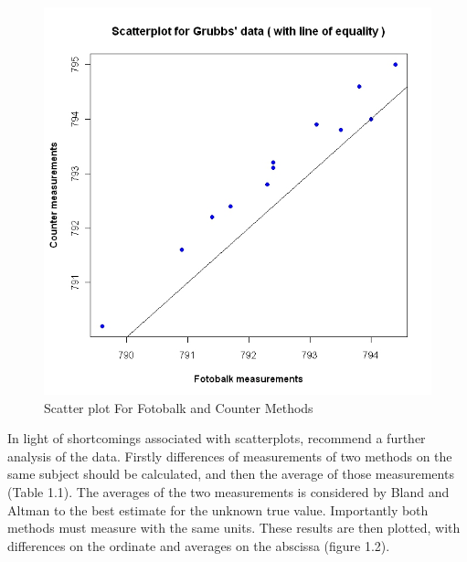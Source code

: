 \documentclass[12pt, a4paper]{report}
\begin{document}
\begin{figure}[h!]
\begin{center}
  \includegraphics[width=130mm]{GrubbsScatter.jpeg}
  \caption{Scatter plot For Fotobalk and Counter Methods}\label{GrubbsScatter}
\end{center}
\end{figure}

In light of shortcomings associated with scatterplots, \citet*{BA83} recommend a further analysis of the data. Firstly
differences of measurements of two methods on the same subject should  be calculated, and then the average of those measurements
(Table 1.1). The averages of the two measurements is considered by Bland and Altman to the best estimate for the unknown true value.
Importantly both methods must measure with the same units. These  results are then plotted, with differences on the ordinate and
averages on the abscissa (figure 1.2).
\end{document}
